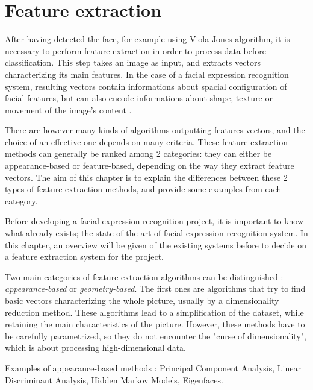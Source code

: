 \chapter{Feature extraction}
\label{chap:extraction}

\noindent After having detected the face, for example using Viola-Jones algorithm, it is necessary to perform feature extraction in order to process data before classification. 
This step takes an image as input, and extracts vectors characterizing its main features. In the case of a facial expression recognition system, resulting vectors contain informations about spacial configuration of facial features, but can also encode informations about shape, texture or movement of the image's content \cite{CHI03}.
\newline

\noindent There are however many kinds of algorithms outputting features vectors, and the choice of an effective one depends on many criteria. These feature extraction methods can generally be ranked among 2 categories: they can either be appearance-based or feature-based, depending on the way they extract feature vectors. The aim of this chapter is to explain the differences between these 2 types of feature extraction methods, and provide some examples from each category.
\newline

\vspace{\baselineskip}
\noindent Before developing a facial expression recognition project, it is important to know what already exists; the state of the art of facial expression recognition system. In this chapter, an overview will be given of the existing systems before to decide on a feature extraction system for the project.
\newline

\noindent Two main categories of feature extraction algorithms can be distinguished : \textit{appearance-based} or \textit{geometry-based}. The first ones are algorithms that try to find basic vectors characterizing the whole picture, usually by a dimensionality reduction method. These algorithms lead to a simplification of the dataset, while retaining the main characteristics of the picture. However, these methods have to be carefully parametrized, so they do not encounter the "curse of dimensionality", which is about processing high-dimensional data.
\vspace{\baselineskip}

\noindent Examples of appearance-based methods : Principal Component Analysis, Linear Discriminant Analysis, Hidden Markov Models, Eigenfaces.
\newline

